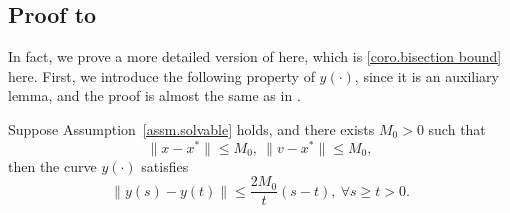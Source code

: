 \documentclass{article}
\begin{document}
\subsection*{Proof to }
In fact, we prove a more detailed version of  here, which is \cref{coro.bisection bound} here. First, we introduce the following property of $y(\cdot)$, since it is an auxiliary lemma, and the proof is almost the same as in \citet{monteiro2013accelerated}.
\begin{lemma}
    \label{lem.curve condition}
    Suppose Assumption~\ref{assm.solvable} holds, and there exists $M_0>0$ such that
    \begin{equation}\label{eq.bounded assm point}
        \|x-x^*\|\leq M_0, \ \|v-x^*\|\leq M_0,
    \end{equation}
    then the curve $y(\cdot)$ satisfies
    \begin{equation}
        \label{eq.curve condition}
        \|y(s)-y(t)\| \leq \frac{2M_0}{t}(s-t), \ \forall s\geq t >0.
    \end{equation}
\end{lemma}
\end{document}
